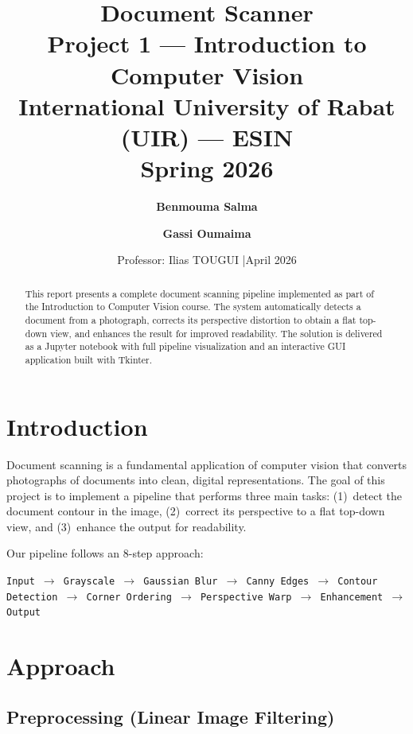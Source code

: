 \documentclass[11pt,a4paper]{article}
\title{
    \vspace{-1.5cm}
    {\Large\textbf{Document Scanner}}\\[0.3em]
    {\normalsize Project 1 --- Introduction to Computer Vision}\\[0.2em]
    {\normalsize International University of Rabat (UIR) --- ESIN}\\[0.2em]
    {\normalsize Spring 2026}
}
\author{
    \textbf{Benmouma Salma} \and \textbf{Gassi Oumaima}
}
\date{
    \vspace{0.2em}
    {\small Professor: Ilias TOUGUI \quad|\quad April 2026}
}
\begin{document}
\maketitle
\thispagestyle{fancy}

\begin{abstract}
\noindent
This report presents a complete document scanning pipeline implemented as part of the Introduction to Computer Vision course. The system automatically detects a document from a photograph, corrects its perspective distortion to obtain a flat top-down view, and enhances the result for improved readability. The solution is delivered as a Jupyter notebook with full pipeline visualization and an interactive GUI application built with Tkinter.
\end{abstract}

\section{Introduction}

Document scanning is a fundamental application of computer vision that converts photographs of documents into clean, digital representations. The goal of this project is to implement a pipeline that performs three main tasks: (1)~detect the document contour in the image, (2)~correct its perspective to a flat top\nobreakdash-down view, and (3)~enhance the output for readability.

Our pipeline follows an 8-step approach:

\begin{center}
\small
\texttt{Input $\rightarrow$ Grayscale $\rightarrow$ Gaussian Blur $\rightarrow$ Canny Edges $\rightarrow$ Contour Detection $\rightarrow$ Corner Ordering $\rightarrow$ Perspective Warp $\rightarrow$ Enhancement $\rightarrow$ Output}
\end{center}

\section{Approach}

\subsection{Preprocessing (Linear Image Filtering)}
\end{document}
